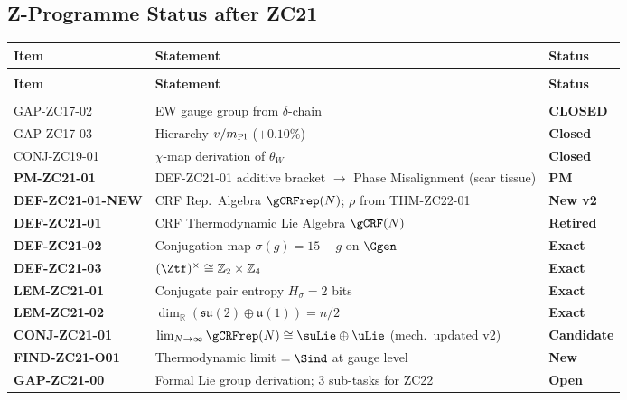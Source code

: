 \documentclass[12pt, a4paper]{article}
\begin{document}
\subsection{Z-Programme Status after ZC21}
\label{zc21:sec:status}

\begin{formalbox}[title={Z-Programme Status after TASK-ZC21}]
{\small
\setlength{\LTpre}{4pt}
\setlength{\LTpost}{4pt}
\renewcommand{\arraystretch}{1.30}
\begin{longtable}{>{\raggedright\arraybackslash}p{3.6cm}
                  >{\raggedright\arraybackslash}p{5.8cm}
                  >{\centering\arraybackslash}p{2.4cm}}
\toprule
\textbf{Item} & \textbf{Statement} & \textbf{Status} \\
\midrule
\endfirsthead
\multicolumn{3}{l}{\small\textit{(continued)}}\\[4pt]
\toprule
\textbf{Item} & \textbf{Statement} & \textbf{Status} \\
\midrule
\endhead
\midrule
\multicolumn{3}{r}{\small\textit{(continues)}}\\
\endfoot
\bottomrule
\endlastfoot
GAP-ZC17-02  & EW gauge group from $\delta$-chain & \textbf{CLOSED} \\
GAP-ZC17-03  & Hierarchy $v/m_{\rm Pl}$ ($+0.10\%$) & \textbf{Closed} \\
CONJ-ZC19-01 & $\chi$-map derivation of $\theta_W$ & \textbf{Closed} \\
\midrule
\textbf{PM-ZC21-01} & DEF-ZC21-01 additive bracket $\to$ Phase Misalignment (scar tissue) & \textbf{PM} \\
\textbf{DEF-ZC21-01-NEW} & CRF Rep.\ Algebra $\gCRFrep(N)$; $\rho$ from THM-ZC22-01 & \textbf{New v2} \\
\textbf{DEF-ZC21-01} & CRF Thermodynamic Lie Algebra $\gCRF(N)$ & \textbf{Retired} \\
\textbf{DEF-ZC21-02} & Conjugation map $\sigma(g)=15-g$ on $\Ggen$ & \textbf{Exact} \\
\textbf{DEF-ZC21-03} & $(\Ztf)^\times \cong \mathbb{Z}_2\times\mathbb{Z}_4$ & \textbf{Exact} \\
\textbf{LEM-ZC21-01} & Conjugate pair entropy $H_\sigma = 2$ bits & \textbf{Exact} \\
\textbf{LEM-ZC21-02} & $\dim_\mathbb{R}(\mathfrak{su}(2)\oplus\mathfrak{u}(1)) = n/2$ & \textbf{Exact} \\
\textbf{CONJ-ZC21-01} & $\lim_{N\to\infty}\gCRFrep(N)\cong\suLie\oplus\uLie$ (mech.\ updated v2) & \textbf{Candidate} \\
\textbf{FIND-ZC21-O01} & Thermodynamic limit $= \Sind$ at gauge level & \textbf{New} \\
\textbf{GAP-ZC21-00}  & Formal Lie group derivation; 3 sub-tasks for ZC22 & \textbf{Open} \\
\end{longtable}
}
\end{formalbox}
\end{document}
